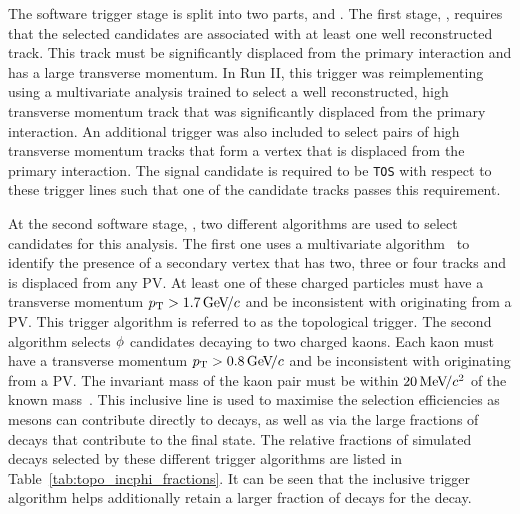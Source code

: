 The software trigger stage is split into two parts, \hltone and \hlttwo.
The first stage, \hltone, requires that the selected candidates are associated with at least one well reconstructed track. This track must be significantly displaced from the primary interaction and has a large transverse momentum. In Run II, this trigger was reimplementing using a multivariate analysis trained to select a well reconstructed, high transverse momentum track that was significantly displaced from the primary interaction. An additional trigger was also included to select pairs of high transverse momentum tracks that form a vertex that is displaced from the primary interaction. The signal candidate is required to be \texttt{TOS} with respect to these trigger lines such that one of the candidate tracks passes this requirement.   




At the second software stage, \hlttwo, two different algorithms are used to select candidates for this analysis.
The first one uses a multivariate algorithm~\cite{BBDT} to identify the presence of a secondary vertex that has two, three or four tracks and is displaced from any PV. At least one of these charged particles must have a transverse momentum $\mbox{$p_{\mathrm{ T}}$} > 1.7{\mathrm{\,Ge\kern -0.1em V\!/}c}$ and be inconsistent with originating from a PV. This trigger algorithm is referred to as the topological trigger.
The second algorithm selects $\phi$ candidates decaying to two charged kaons. Each kaon must have a transverse momentum $\mbox{$p_{\mathrm{ T}}$} > 0.8{\mathrm{\,Ge\kern -0.1em V\!/}c}$ and be inconsistent with originating from a PV. The invariant mass of the kaon pair must be within $20{\mathrm{\,Me\kern -0.1em V\!/}c^2}$ of the known \phiz mass~\cite{PDG2016}.
This inclusive \phiz line is used to maximise the selection efficiencies as \phiz mesons can contribute directly to \decay{\Bp}{\Dsp\phiz} decays, as well as via the large fractions of \decay{\Dsp}{\phiz\pip} decays that contribute to the \decay{\Dsp}{\Kp\Km\pip} final state.
The relative fractions of simulated \decay{\Bp}{\Dsp\phiz} decays selected by these different trigger algorithms are listed in Table~\ref{tab:topo_incphi_fractions}. It can be seen that the inclusive \phiz trigger algorithm helps additionally retain a larger fraction of decays for the \decay{\Dsp}{\Kp\Km\pip} decay. 

